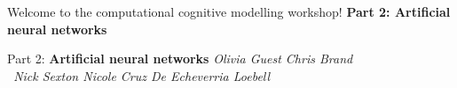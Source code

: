 \documentclass[mathserif]{beamer}
\begin{document}
\begin{frame}
% 
\centering\Huge Welcome to the computational cognitive modelling workshop! 
\vfill \huge
\centering\textbf{Part 2: Artificial neural networks} \normalsize
\vfill
\end{frame}

\begin{frame}
% 
\vfill \Huge
\centering Part 2: \textbf{Artificial neural networks} \large
\vfill
\textit{
Olivia Guest \hfill  Chris Brand 
\vspace{0.5cm} \\ \ 
Nick Sexton \hfill Nicole Cruz De Echeverria Loebell } 
\end{frame}
\end{document}
